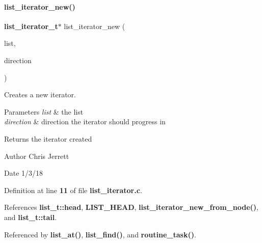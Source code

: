 \paragraph{list\+\_\+iterator\+\_\+new()}
{\footnotesize\ttfamily \textbf{ list\+\_\+iterator\+\_\+t}$\ast$ list\+\_\+iterator\+\_\+new (\begin{DoxyParamCaption}\item[{\textbf{ list\+\_\+t} $\ast$}]{list,  }\item[{\textbf{ list\+\_\+direction\+\_\+t}}]{direction }\end{DoxyParamCaption})}



Creates a new iterator. 


\begin{DoxyParams}{Parameters}
{\em list} & the list \\
\hline
{\em direction} & direction the iterator should progress in \\
\hline
\end{DoxyParams}
\begin{DoxyReturn}{Returns}
the iterator created 
\end{DoxyReturn}
\begin{DoxyAuthor}{Author}
Chris Jerrett 
\end{DoxyAuthor}
\begin{DoxyDate}{Date}
1/3/18 
\end{DoxyDate}


Definition at line \textbf{ 11} of file \textbf{ list\+\_\+iterator.\+c}.



References \textbf{ list\+\_\+t\+::head}, \textbf{ L\+I\+S\+T\+\_\+\+H\+E\+AD}, \textbf{ list\+\_\+iterator\+\_\+new\+\_\+from\+\_\+node()}, and \textbf{ list\+\_\+t\+::tail}.



Referenced by \textbf{ list\+\_\+at()}, \textbf{ list\+\_\+find()}, and \textbf{ routine\+\_\+task()}.


